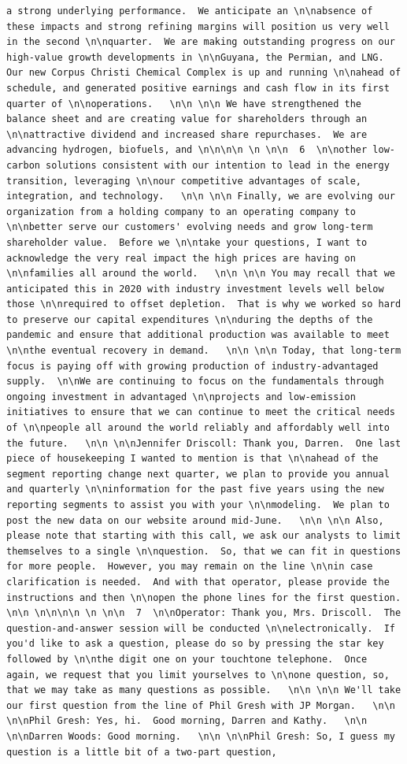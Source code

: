 \documentclass[
  letterpaper,
  DIV=11,
  numbers=noendperiod]{scrreprt}
\begin{document}
\begin{verbatim}
a strong underlying performance.  We anticipate an \n\nabsence of these impacts and strong refining margins will position us very well in the second \n\nquarter.  We are making outstanding progress on our high-value growth developments in \n\nGuyana, the Permian, and LNG.  Our new Corpus Christi Chemical Complex is up and running \n\nahead of schedule, and generated positive earnings and cash flow in its first quarter of \n\noperations.   \n\n \n\n We have strengthened the balance sheet and are creating value for shareholders through an \n\nattractive dividend and increased share repurchases.  We are advancing hydrogen, biofuels, and \n\n\n\n \n \n\n  6  \n\nother low-carbon solutions consistent with our intention to lead in the energy transition, leveraging \n\nour competitive advantages of scale, integration, and technology.   \n\n \n\n Finally, we are evolving our organization from a holding company to an operating company to \n\nbetter serve our customers' evolving needs and grow long-term shareholder value.  Before we \n\ntake your questions, I want to acknowledge the very real impact the high prices are having on \n\nfamilies all around the world.   \n\n \n\n You may recall that we anticipated this in 2020 with industry investment levels well below those \n\nrequired to offset depletion.  That is why we worked so hard to preserve our capital expenditures \n\nduring the depths of the pandemic and ensure that additional production was available to meet \n\nthe eventual recovery in demand.   \n\n \n\n Today, that long-term focus is paying off with growing production of industry-advantaged supply.  \n\nWe are continuing to focus on the fundamentals through ongoing investment in advantaged \n\nprojects and low-emission initiatives to ensure that we can continue to meet the critical needs of \n\npeople all around the world reliably and affordably well into the future.   \n\n \n\nJennifer Driscoll: Thank you, Darren.  One last piece of housekeeping I wanted to mention is that \n\nahead of the segment reporting change next quarter, we plan to provide you annual and quarterly \n\ninformation for the past five years using the new reporting segments to assist you with your \n\nmodeling.  We plan to post the new data on our website around mid-June.   \n\n \n\n Also, please note that starting with this call, we ask our analysts to limit themselves to a single \n\nquestion.  So, that we can fit in questions for more people.  However, you may remain on the line \n\nin case clarification is needed.  And with that operator, please provide the instructions and then \n\nopen the phone lines for the first question.   \n\n \n\n\n\n \n \n\n  7  \n\nOperator: Thank you, Mrs. Driscoll.  The question-and-answer session will be conducted \n\nelectronically.  If you'd like to ask a question, please do so by pressing the star key followed by \n\nthe digit one on your touchtone telephone.  Once again, we request that you limit yourselves to \n\none question, so, that we may take as many questions as possible.   \n\n \n\n We'll take our first question from the line of Phil Gresh with JP Morgan.   \n\n \n\nPhil Gresh: Yes, hi.  Good morning, Darren and Kathy.   \n\n \n\nDarren Woods: Good morning.   \n\n \n\nPhil Gresh: So, I guess my question is a little bit of a two-part question, 
\end{verbatim}
\end{document}
